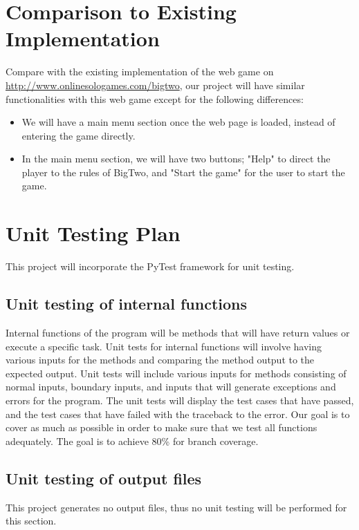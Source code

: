 \documentclass[12pt, titlepage]{article}
\begin{document}
\section{Comparison to Existing Implementation}	
Compare with the existing implementation of the web game on \url{http://www.onlinesologames.com/bigtwo}, our project will have similar functionalities with this web game except for the following differences:
\begin{itemize}
    \item We will have a main menu section once the web page is loaded, instead of entering the game directly.
    \item In the main menu section, we will have two buttons; "Help" to direct the player to the rules of BigTwo, and "Start the game" for the user to start the game.
\end{itemize}
				
\section{Unit Testing Plan}
This project will incorporate the PyTest framework for unit testing.
\subsection{Unit testing of internal functions}
Internal functions of the program will be methods that will have return values or execute a specific task. Unit tests for internal functions will involve having various inputs for the methods and comparing the method output to the expected output. Unit tests will include various inputs for methods consisting of normal inputs, boundary inputs, and inputs that will generate exceptions and errors for the program. The unit tests will display the test cases that have passed, and the test cases that have failed with the traceback to the error. Our goal is to cover as much as possible in order to make sure that we test all functions adequately.
The goal is to achieve 80\% for branch coverage.
\subsection{Unit testing of output files}		
This project generates no output files, thus no unit testing will be performed for this section.





\newpage
\end{document}
